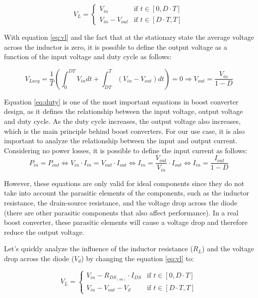 \begin{equation}
    V_L = \begin{cases}
    V_{in} & \text{if } t \in [0, D \cdot T] \\
    V_{in} - V_{out} & \text{if } t \in [D \cdot T, T]
  \end{cases}
  \label{eq:vl}
\end{equation}

With equation \ref{eq:vl} and the fact that at the stationary state the average voltage across the inductor is zero, it is possible to define the output voltage as a function of the input voltage and duty cycle as follows:

\begin{equation}
    V_{Lavg} = \frac{1}{T} (\int_{0}^{DT} V_{in} dt + \int_{DT}^{T} (V_{in} - V_{out}) dt) = 0 \Rightarrow V_{out} = \frac{V_{in}}{1-D}
    \label{eq:duty}
\end{equation}

Equation \ref{eq:duty} is one of the most important equations in boost converter design, as it defines the relationship between the input voltage, output voltage and duty cycle. As the duty cycle increases, the output voltage also increases, which is the main principle behind boost converters. For our use case, it is also important to analyze the relationship between the input and output current. Considering no power losses, it is possible to define the input current as follows:
\begin{equation}
    P_{in} = P_{out} \Leftrightarrow V_{in} \cdot I_{in} = V_{out} \cdot I_{out} \Leftrightarrow I_{in} = \frac{V_{out}}{V_{in}} \cdot I_{out} \Leftrightarrow I_{in} = \frac{I_{out}}{1-D}
\end{equation}

However, these equations are only valid for ideal components since they do not take into account the parasitic elements of the components, such as the inductor resistance, the drain-source resistance, and the voltage drop across the diode (there are other parasitic components that also affect performance). In a real boost converter, these parasitic elements will cause a voltage drop and therefore reduce the output voltage. 

Let's quickly analyze the influence of the inductor resistance ($R_L$) and the voltage drop across the diode ($V_d$) by changing the equation \ref{eq:vl} to:

\begin{equation}
    V_L = \begin{cases}
    V_{in} - R_{DS_{(on)}} \cdot I_{DS} & \text{if } t \in [0, D \cdot T] \\
    V_{in} - V_{out} - V_d & \text{if } t \in [D \cdot T, T]
  \end{cases}
  \label{eq:vl2}
\end{equation}

